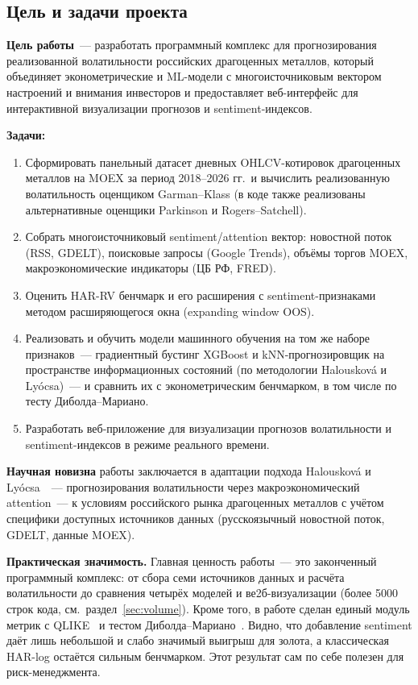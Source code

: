 \subsection*{Цель и задачи проекта}

\textbf{Цель работы}~--- разработать программный комплекс для
прогнозирования реализованной волатильности российских драгоценных металлов,
который объединяет эконометрические и ML-модели с многоисточниковым
вектором настроений и внимания инвесторов и предоставляет
веб-интерфейс для интерактивной визуализации прогнозов и sentiment-индексов.

\textbf{Задачи:}
\begin{enumerate}
    \item Сформировать панельный датасет дневных OHLCV-котировок драгоценных металлов
          на MOEX за период 2018--2026 гг.\ и вычислить реализованную волатильность
          оценщиком Garman--Klass (в коде также реализованы альтернативные
          оценщики Parkinson и Rogers--Satchell).
    \item Собрать многоисточниковый sentiment/attention вектор:
          новостной поток (RSS, GDELT), поисковые запросы (Google Trends),
          объёмы торгов MOEX, макроэкономические индикаторы (ЦБ РФ, FRED).
    \item Оценить HAR-RV бенчмарк и его расширения с sentiment-признаками
          методом расширяющегося окна (expanding window OOS).
    \item Реализовать и обучить модели машинного обучения на том же наборе
          признаков~--- градиентный бустинг XGBoost и kNN-прогнозировщик на
          пространстве информационных состояний (по методологии Halousková
          и Lyócsa)~--- и сравнить их с эконометрическим бенчмарком,
          в том числе по тесту Диболда--Мариано.
    \item Разработать веб-приложение для визуализации прогнозов волатильности
          и sentiment-индексов в режиме реального времени.
\end{enumerate}

\textbf{Научная новизна} работы заключается в адаптации подхода
Halousková и Lyócsa~\cite{Halouskova2025}~--- прогнозирования волатильности
через макроэкономический attention~--- к условиям российского рынка драгоценных металлов
с учётом специфики доступных источников данных (русскоязычный новостной поток,
GDELT, данные MOEX).

\textbf{Практическая значимость.}
Главная ценность работы~--- это законченный программный комплекс:
от сбора семи источников данных и расчёта волатильности до сравнения
четырёх моделей и ве2б-визуализации (более 5000 строк кода,
см.\ раздел~\ref{sec:volume}). Кроме того, в работе сделан единый модуль
метрик с QLIKE~\cite{Patton2011} и тестом Диболда--Мариано~\cite{Diebold1995}.
Видно, что добавление sentiment даёт лишь небольшой
и слабо значимый выигрыш для золота, а классическая HAR-log остаётся сильным
бенчмарком. Этот результат сам по себе полезен для риск-менеджмента.

